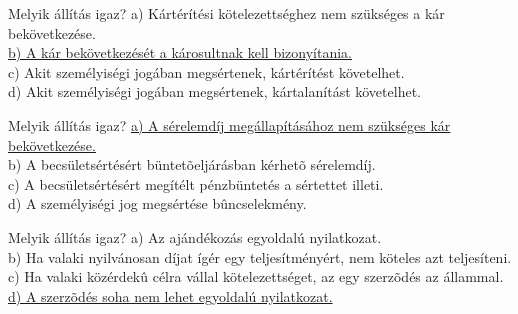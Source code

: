 \begin{frame}

\begin{tcolorbox}[title={134. Kérdés}]
Melyik állítás igaz?
\tcblower
a) Kártérítési kötelezettséghez nem szükséges a kár bekövetkezése.\\
\uline {b) A kár bekövetkezését a károsultnak kell bizonyítania.}\\
c) Akit személyiségi jogában megsértenek, kártérítést követelhet.\\
d) Akit személyiségi jogában megsértenek, kártalanítást követelhet. 
\end{tcolorbox}

\begin{tcolorbox}[title={135. Kérdés}]
Melyik állítás igaz?
\tcblower
\uline {a) A sérelemdíj megállapításához nem szükséges kár bekövetkezése.}\\
b) A becsületsértésért büntetõeljárásban kérhetõ sérelemdíj.\\
c) A becsületsértésért megítélt pénzbüntetés a sértettet illeti.\\
d) A személyiségi jog megsértése bûncselekmény.
\end{tcolorbox}

\begin{tcolorbox}[title={136. Kérdés}]
Melyik állítás igaz?
\tcblower
a) Az ajándékozás egyoldalú nyilatkozat.\\
b) Ha valaki nyilvánosan díjat ígér egy teljesítményért, nem köteles azt teljesíteni.\\
c) Ha valaki közérdekû célra vállal kötelezettséget, az egy szerzõdés az állammal.\\
\uline {d) A szerzõdés soha nem lehet egyoldalú nyilatkozat.}
\end{tcolorbox}

\end{frame}


